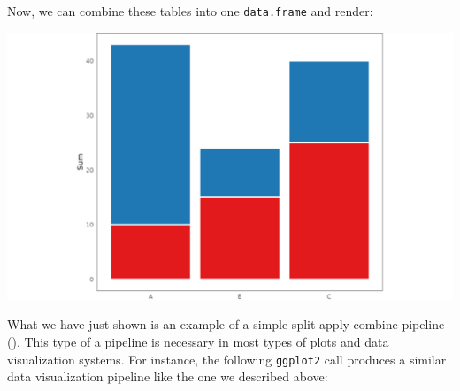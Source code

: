 \documentclass[
]{book}
\newenvironment{Shaded}{\begin{snugshade}}{\end{snugshade}}
\newcommand{\AttributeTok}[1]{\textcolor[rgb]{0.13,0.29,0.53}{#1}}
\newcommand{\CommentTok}[1]{\textcolor[rgb]{0.56,0.35,0.01}{\textit{#1}}}
\newcommand{\DecValTok}[1]{\textcolor[rgb]{0.00,0.00,0.81}{#1}}
\newcommand{\FunctionTok}[1]{\textcolor[rgb]{0.13,0.29,0.53}{\textbf{#1}}}
\newcommand{\NormalTok}[1]{#1}
\newcommand{\OtherTok}[1]{\textcolor[rgb]{0.56,0.35,0.01}{#1}}
\newcommand{\SpecialCharTok}[1]{\textcolor[rgb]{0.81,0.36,0.00}{\textbf{#1}}}
\theoremstyle{definition}
\theoremstyle{definition}
\theoremstyle{definition}
\theoremstyle{definition}
\theoremstyle{remark}
\begin{document}
Now, we can combine these tables into one \texttt{data.frame} and render:

\begin{Shaded}
\end{Shaded}

\begin{center}\includegraphics[width=1\linewidth,height=1\textheight]{./figures/barplot-partitions-products} \end{center}

What we have just shown is an example of a simple split-apply-combine pipeline (). This type of a pipeline is necessary in most types of plots and data visualization systems. For instance, the following \texttt{ggplot2} call produces a similar data visualization pipeline like the one we described above:
\end{document}
